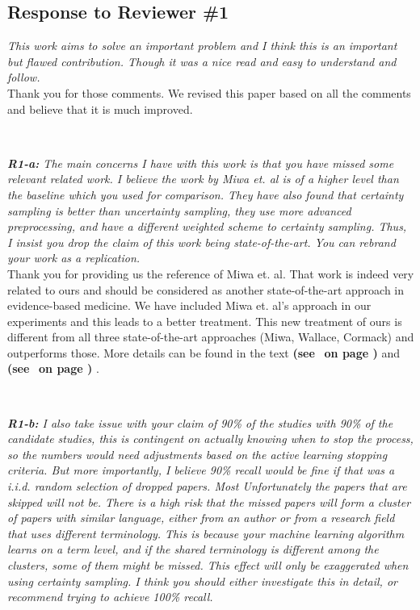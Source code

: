 \documentclass{svjour3}
\theoremstyle{break}
\newcommand{\review}[1]{{\textit{#1}}~\\}
\newcommand{\citeresp}[1]{
{\bf (see } \fcolorbox{black}{black!15}{
 \bf
  \scriptsize R-{#1}}~{\bf{on page \pageref{response:#1})}}
}
\begin{document}
 



\subsection*{Response to Reviewer \#1}

\review{ This work aims to solve an important problem and I think this is an important but flawed contribution. Though it was a nice read and easy to understand and follow.}

Thank you for those comments. We revised this paper based on all the comments and believe that it is much improved.
\par ~

\review{\textbf{R1-a:} The main concerns I have with this work is that you have missed some relevant related work. I believe the work by Miwa et. al is of a higher level than the baseline which you used for comparison. They have also found that certainty sampling is better than uncertainty sampling, they use more advanced preprocessing, and have a different weighted scheme to certainty sampling. Thus, I insist you drop the claim of this work being state-of-the-art. You can rebrand your work as a replication.
}

Thank you for providing us the reference of Miwa et. al. That work is indeed very related to ours and should be considered as another state-of-the-art approach in evidence-based medicine. We have included Miwa et. al's approach in our experiments and this leads to a better treatment. This new treatment of ours is different from all three state-of-the-art approaches (Miwa, Wallace, Cormack) and outperforms those. More details can be found in the text \citeresp{1a1} and \citeresp{1a2}.
 

\par ~

\review{\textbf{R1-b:} I also take issue with your claim of 90\% of the studies with 90\% of the candidate studies, this is contingent on actually knowing when to stop the process, so the numbers would need adjustments based on the active learning stopping criteria. But more importantly, I believe 90\% recall would be fine if that was a i.i.d. random selection of dropped papers. Most Unfortunately the papers that are skipped will not be. There is a high risk that the missed papers will form a cluster of papers with similar language, either from an author or from a research field that uses different terminology. This is because your machine learning algorithm learns on a term level, and if the shared terminology is different among the clusters, some of them might be missed. This effect will only be exaggerated when using certainty sampling. I think you should either investigate this in detail, or recommend trying to achieve 100\% recall.
}
\end{document}
